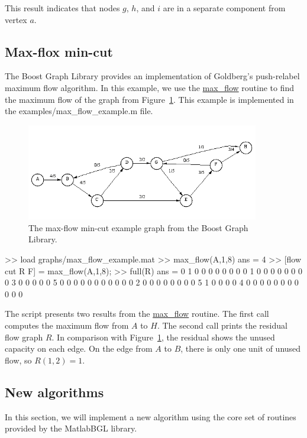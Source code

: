 \documentclass[12pt]{article}
\newcommand{\mycmd}[1]{\url{#1}}
\newcommand{\mypath}[1]{{\ttfamily \small #1}}
\begin{document}
This result indicates that nodes $g$, $h$, and $i$ are in a separate component from vertex $a$.  

\subsection{Max-flox min-cut}
The Boost Graph Library provides an implementation of Goldberg's push-relabel maximum flow algorithm.  In this example, we use the \mycmd{max_flow} routine to find the maximum flow of the graph from Figure~\ref{fig:mincut}.  This example is implemented in the \mypath{examples/max\_flow\_example.m} file.  

\begin{figure}[ht!]
\centering
\includegraphics[width=4in]{max-flow}
\caption{The max-flow min-cut example graph from the Boost Graph Library.}
\label{fig:mincut}
\end{figure}

\begin{mcode}
>> load graphs/max_flow_example.mat
>> max_flow(A,1,8)
ans =
     4
>> [flow cut R F] = max_flow(A,1,8);
>> full(R)     
ans =
     0     1     0     0     0     0     0     0
     0     0     1     0     0     0     0     0
     0     0     0     3     0     0     0     0
     0     5     0     0     0     0     0     0
     0     0     0     0     0     2     0     0
     0     0     0     0     0     0     5     1
     0     0     0     0     4     0     0     0
     0     0     0     0     0     0     0     0
\end{mcode}

The script presents two results from the \mycmd{max_flow} routine.  The first call computes the maximum flow from $A$ to $H$.  The second call prints the residual flow graph $R$.  In comparison with Figure~\ref{fig:mincut}, the residual shows the unused capacity on each edge. On the edge from $A$ to $B$, there is only one unit of unused flow, so $R(1,2) = 1$.  

\subsection{New algorithms}
In this section, we will implement a new algorithm using the core set of routines provided by the MatlabBGL library.
\end{document}
